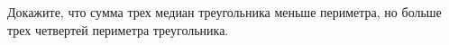\begin{ex}
	\begin{condition}
		Докажите, что сумма трех медиан треугольника меньше периметра, но больше трех четвертей периметра треугольника.
	\end{condition}
\end{ex}